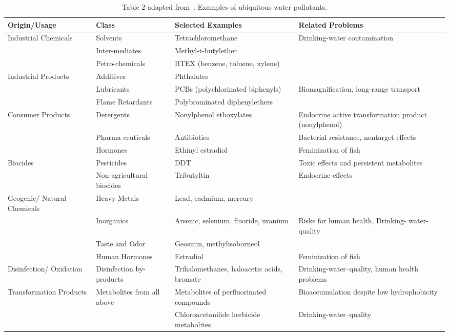 \begin{table}[h]
    \caption{Table 2 adapted from~\cite{schwarzenbach2006}. Examples of ubiquitous water pollutants.}
    \label{tab:water_pollutants}
    \begin{tabular}{p{2.2cm} p{1.7cm} p{3.5cm} p{3.9cm}}
    \toprule
    Origin/Usage & Class & Selected Examples & Related Problems \\
    \midrule
    Industrial Chemicals & Solvents & Tetrachloromethane & Drinking-water contamination \\
    & Inter-mediates & Methyl-t-butylether & \\ 
    & Petro-chemicals & BTEX (benzene, toluene, xylene) & \\ \hline
    Industrial Products & Additives & Phthalates & \\
     & Lubricants & PCBs (polychlorinated biphenyls) & Biomagnification, long-range transport \\
     & Flame Retardants & Polybrominated diphenylethers & \\ \hline
    Consumer Products & Detergents & Nonylphenol ethoxylates & Endocrine active transformation product (nonylphenol) \\
     & Pharma-ceuticals & Antibiotics & Bacterial resistance, nontarget effects \\
     & Hormones & Ethinyl estradiol & Feminization of fish \\ \hline
     Biocides & Pesticides & DDT & Toxic effects and persistent metabolites \\
     & Non-agricultural biocides & Tributyltin & Endocrine effects \\ \hline
    Geogenic/ Natural Chemicals & Heavy Metals & Lead, cadmium, mercury & \\
     & Inorganics & Arsenic, selenium, fluoride, uranium & Risks for human health, Drinking-
     water-quality\\
     & Taste and Odor & Geosmin, methylisoborneol & \\
     & Human Hormones & Estradiol & Feminization of fish \\ \hline
    Disinfection/ Oxidation & Disinfection by-products & Trihalomethanes, haloacetic acids, bromate & Drinking-water–quality, human health problems \\ \hline
     Transformation Products & Metabolites from all above & Metabolites of perfluorinated compounds & Bioaccumulation despite low hydrophobicity \\
     & & Chloroacetanilide herbicide metabolites & Drinking-water–quality \\
    \bottomrule
    \end{tabular}
    \label{tab:ubiquitous_water_pollutants}
\end{table}


